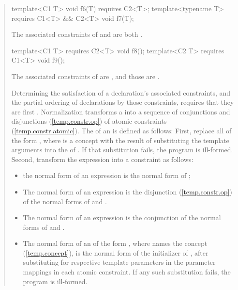 \begin{quote}
\begin{addedblock}
\begin{codeblock}
template<C1 T> void f6(T) requires C2<T>;
template<typename T> requires C1<T> && C2<T> void f7(T);
\end{codeblock}
The associated constraints of  and  are both
.
% 
\begin{codeblock}
template<C1 T> requires C2<T> void f8();
template<C2 T> requires C1<T> void f9();
\end{codeblock}
% 
The associated constraints of  are
, and those  are
.
\exitexample

\pnum
Determining the satisfaction of a declaration's associated constraints,
and the partial ordering of declarations by those constraints,
requires that they are first .
% 
Normalization transforms a  into a sequence of 
conjunctions and disjunctions (\ref{temp.constr.op})
of atomic constraints (\ref{temp.constr.atomic}).
% 
The  of an   is 
defined as follows:
% 
First, replace all  of the form 
, where  is a concept with the 
result of substituting the template arguments  
into the  of .
% 
If that substitution fails, the program is ill-formed.
% 
Second, transform the expression  into a constraint as follows:
\begin{itemize}
\item the normal form of an expression  is the normal form
of ;

\item The normal form of an expression  is the  
disjunction (\ref{temp.constr.op}) of the normal forms of  
and .

\item The normal form of an expression  is the  
conjunction of the normal forms of  
and .

\item The normal form of an  of the form
, where  names the concept
 (\ref{temp.concept}),
is the normal form of the initializer of ,
after substituting  for
 respective template parameters in the
parameter mappings in each atomic constraint.
If any such substitution fails, the program is ill-formed.


\end{itemize}
\end{addedblock}
\end{quote}
